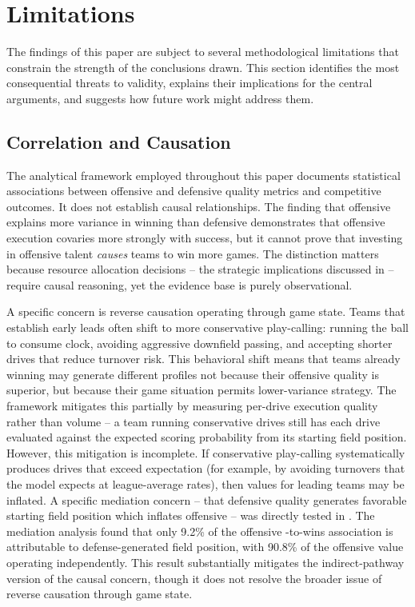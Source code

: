 \section{Limitations}
\label{sec:limitations}

The findings of this paper are subject to several methodological limitations
that constrain the strength of the conclusions drawn. This section identifies
the most consequential threats to validity, explains their implications for the
central arguments, and suggests how future work might address them.

\subsection{Correlation and Causation}
\label{sec:lim-causation}

The analytical framework employed throughout this paper documents statistical
associations between offensive and defensive quality metrics and competitive
outcomes. It does not establish causal relationships. The finding that offensive
\xvoa{} explains more variance in winning than defensive \xvoa{} demonstrates
that offensive execution covaries more strongly with success, but it cannot prove
that investing in offensive talent \emph{causes} teams to win more games. The
distinction matters because resource allocation decisions -- the strategic
implications discussed in  -- require causal reasoning,
yet the evidence base is purely observational.

A specific concern is reverse causation operating through game state. Teams that
establish early leads often shift to more conservative play-calling: running the
ball to consume clock, avoiding aggressive downfield passing, and accepting
shorter drives that reduce turnover risk. This behavioral shift means that
teams already winning may generate different \xscore{} profiles not because
their offensive quality is superior, but because their game situation permits
lower-variance strategy. The \gds{} framework mitigates this partially by
measuring per-drive execution quality rather than volume -- a team running
conservative drives still has each drive evaluated against the expected scoring
probability from its starting field position. However, this mitigation is
incomplete. If conservative play-calling systematically produces drives that
exceed expectation (for example, by avoiding turnovers that the model expects at
league-average rates), then \xvoa{} values for leading teams may be inflated.
A specific mediation concern -- that defensive quality generates favorable
starting field position which inflates offensive \xvoa{} -- was directly tested
in . The mediation analysis found that only 9.2\%
of the offensive \xvoa{}-to-wins association is attributable to
defense-generated field position, with 90.8\% of the offensive value operating
independently. This result substantially mitigates the indirect-pathway
version of the causal concern, though it does not resolve the broader issue
of reverse causation through game state.


